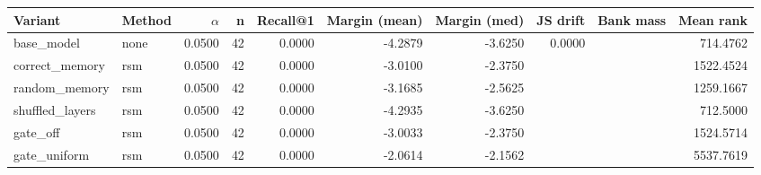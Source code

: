\begin{tabular}{l l r r r r r r r r}
\toprule
Variant & Method & $\alpha$ & n & Recall@1 & Margin (mean) & Margin (med) & JS drift & Bank mass & Mean rank \\
\midrule
base\_model & none & 0.0500 & 42 & 0.0000 & -4.2879 & -3.6250 & 0.0000 &  & 714.4762 \\
correct\_memory & rsm & 0.0500 & 42 & 0.0000 & -3.0100 & -2.3750 &  &  & 1522.4524 \\
random\_memory & rsm & 0.0500 & 42 & 0.0000 & -3.1685 & -2.5625 &  &  & 1259.1667 \\
shuffled\_layers & rsm & 0.0500 & 42 & 0.0000 & -4.2935 & -3.6250 &  &  & 712.5000 \\
gate\_off & rsm & 0.0500 & 42 & 0.0000 & -3.0033 & -2.3750 &  &  & 1524.5714 \\
gate\_uniform & rsm & 0.0500 & 42 & 0.0000 & -2.0614 & -2.1562 &  &  & 5537.7619 \\
\bottomrule
\end{tabular}

